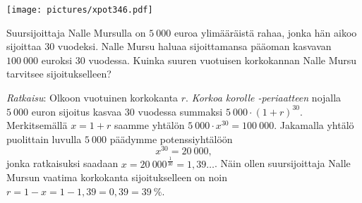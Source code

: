 \begin{esimerkki}
\begin{alakohdat}
\end{alakohdat}

\begin{center}
\texttt{[image: pictures/xpot346.pdf]}
\end{center}
\end{esimerkki}


\begin{esimerkki}
Suursijoittaja Nalle Mursulla on $5~000$ euroa ylimääräistä rahaa, jonka hän aikoo sijoittaa $30$ vuodeksi.  Nalle Mursu haluaa sijoittamansa pääoman kasvavan $100~000$ euroksi $30$ vuodessa.  Kuinka suuren vuotuisen korkokannan Nalle Mursu tarvitsee sijoitukselleen? 

\emph{Ratkaisu}:  Olkoon vuotuinen korkokanta $r$. \emph{Korkoa korolle -periaatteen} nojalla $5~000$ euron sijoitus kasvaa $30$ vuodessa summaksi $5~000\cdot(1+r)^{30}$.  Merkitsemällä $x=1+r$ saamme yhtälön $5~000\cdot x^{30} = 100~000$.  Jakamalla yhtälö puolittain luvulla $5~000$ päädymme 
potenssiyhtälöön 
$$
x^{30} = 20~000,
$$ 
jonka ratkaisuksi saadaan $x=20~000^{\frac{1}{30}} = 1{,}39\ldots$. Näin
ollen suursijoittaja Nalle Mursun vaatima korkokanta sijoitukselleen on noin $r=1-x=1-1,39=0,39=39~\%$.
\end{esimerkki}






